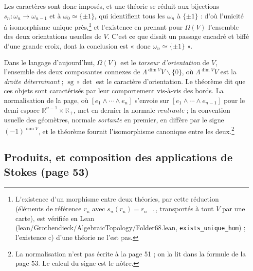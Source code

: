 \documentclass[11pt,a4paper]{article}
\begin{document}
Les caractères sont donc imposés, et une théorie se réduit aux bijections
$s_n : \omega_n \to \omega_{n-1}$ et à $\omega_0 \simeq \{\pm 1\}$, qui
identifient tous les $\omega_n$ à $\{\pm 1\}$ : d'où l'unicité à isomorphisme
unique près,\footnote{L'existence d'un morphisme entre deux théories, par
cette réduction (éléments de référence $r_n$ avec $s_n(r_n) = r_{n-1}$,
transportés à tout $V$ par une carte), est vérifiée en Lean
(lean/Grothendieck/AlgebraicTopology/Folder68.lean, \texttt{exists\_unique\_hom}) ;
l'existence c) d'une théorie ne l'est pas.} et l'existence en prenant pour $\Omega(V)$ l'ensemble des deux
orientations usuelles de $V$. C'est ce que disait un passage encadré et
biffé d'une grande croix, dont la conclusion est « donc
$\omega_n \simeq \{\pm 1\}$ ».

Dans le langage d'aujourd'hui, $\Omega(V)$ est le \emph{torseur
d'orientation} de $V$, l'ensemble des deux composantes connexes de
$\Lambda^{\dim V} V \smallsetminus \{0\}$, où $\Lambda^{\dim V} V$ est la
\emph{droite déterminant} ; $\operatorname{sg} \circ \det$ est le caractère
d'orientation. Le théorème dit que ces objets sont caractérisés par leur
comportement vis-à-vis des bords. La normalisation de la page, où
$[e_1 \wedge \cdots \wedge e_n]$ s'envoie sur
$[e_1 \wedge \cdots \wedge e_{n-1}]$ pour le demi-espace
$\mathbb{R}^{n-1} \times \mathbb{R}_+$, met en dernier la normale
\emph{rentrante} ; la convention usuelle des géomètres, normale
\emph{sortante} en premier, en diffère par le signe $(-1)^{\dim V}$, et le
théorème fournit l'isomorphisme canonique entre les deux.\footnote{La
normalisation n'est pas écrite à la page 51 ; on la lit dans la formule de
la page 53. Le calcul du signe est le nôtre.}

\subsection*{Produits, et composition des applications de Stokes (page 53)}
\end{document}
